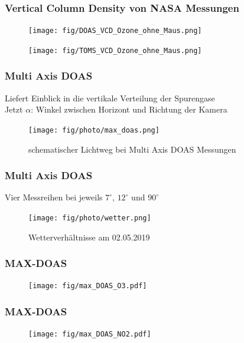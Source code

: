 \documentclass{beamer}
\begin{document}
\begin{frame}
	 \frametitle{Vertical Column Density  von NASA Messungen}
	 \begin{figure}	
    	\texttt{[image: fig/DOAS\_VCD\_Ozone\_ohne\_Maus.png]}
    \end{figure}
    \begin{figure}
    	\texttt{[image: fig/TOMS\_VCD\_Ozone\_ohne\_Maus.png]}
    \end{figure}
	
\end{frame}

\begin{frame}
    \frametitle{Multi Axis DOAS}
    Liefert Einblick in die vertikale Verteilung der Spurengase \\
    Jetzt $\alpha$: Winkel zwischen Horizont und Richtung der Kamera
    \begin{figure}
        \texttt{[image: fig/photo/max\_doas.png]}
        \caption{schematischer Lichtweg bei Multi Axis DOAS Messungen}
    \end{figure}
\end{frame}

\begin{frame}
    \frametitle{Multi Axis DOAS}
    Vier Messreihen bei jeweils $7^\circ$, $12^\circ$ und $90^\circ$ \\
    \begin{figure}
    	\texttt{[image: fig/photo/wetter.png]}
    	\caption{Wetterverhältnisse am 02.05.2019}
    \end{figure}
\end{frame}

\begin{frame}
    \frametitle{MAX-DOAS }
    \begin{figure}
    	\texttt{[image: fig/max\_DOAS\_O3.pdf]}
    \end{figure}
\end{frame}

\begin{frame}
    \frametitle{MAX-DOAS }
    \begin{figure}
    	\texttt{[image: fig/max\_DOAS\_NO2.pdf]}
    \end{figure}
\end{frame}
\end{document}
